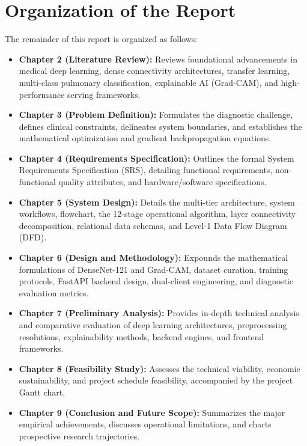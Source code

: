 \documentclass[12pt,a4paper]{report}
\begin{document}
\section{Organization of the Report}
The remainder of this report is organized as follows:
\begin{itemize}
    \item \textbf{Chapter 2 (Literature Review):} Reviews foundational advancements in medical deep learning, dense connectivity architectures, transfer learning, multi-class pulmonary classification, explainable AI (Grad-CAM), and high-performance serving frameworks.
    \item \textbf{Chapter 3 (Problem Definition):} Formulates the diagnostic challenge, defines clinical constraints, delineates system boundaries, and establishes the mathematical optimization and gradient backpropagation equations.
    \item \textbf{Chapter 4 (Requirements Specification):} Outlines the formal System Requirements Specification (SRS), detailing functional requirements, non-functional quality attributes, and hardware/software specifications.
    \item \textbf{Chapter 5 (System Design):} Details the multi-tier architecture, system workflows, flowchart, the 12-stage operational algorithm, layer connectivity decomposition, relational data schemas, and Level-1 Data Flow Diagram (DFD).
    \item \textbf{Chapter 6 (Design and Methodology):} Expounds the mathematical formulations of DenseNet-121 and Grad-CAM, dataset curation, training protocols, FastAPI backend design, dual-client engineering, and diagnostic evaluation metrics.
    \item \textbf{Chapter 7 (Preliminary Analysis):} Provides in-depth technical analysis and comparative evaluation of deep learning architectures, preprocessing resolutions, explainability methods, backend engines, and frontend frameworks.
    \item \textbf{Chapter 8 (Feasibility Study):} Assesses the technical viability, economic sustainability, and project schedule feasibility, accompanied by the project Gantt chart.
    \item \textbf{Chapter 9 (Conclusion and Future Scope):} Summarizes the major empirical achievements, discusses operational limitations, and charts prospective research trajectories.
\end{itemize}


\end{document}
